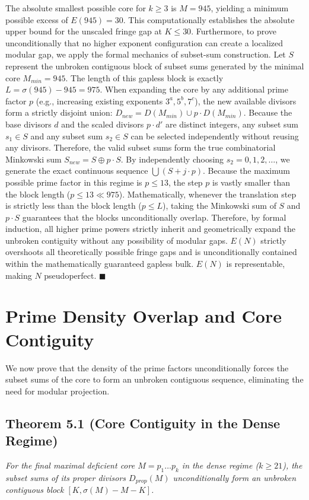\documentclass{erdos_paper}
\begin{document}
The absolute smallest possible core for $k \ge 3$ is $M=945$, yielding a minimum possible excess of $E(945) = 30$. This computationally establishes the absolute upper bound for the unscaled fringe gap at $K \le 30$. Furthermore, to prove unconditionally that no higher exponent configuration can create a localized modular gap, we apply the formal mechanics of subset-sum construction. Let $S$ represent the unbroken contiguous block of subset sums generated by the minimal core $M_{min} = 945$. The length of this gapless block is exactly $L = \sigma(945) - 945 = 975$. When expanding the core by any additional prime factor $p$ (e.g., increasing existing exponents $3^a, 5^b, 7^c$), the new available divisors form a strictly disjoint union: $D_{new} = D(M_{min}) \cup p \cdot D(M_{min})$. Because the base divisors $d$ and the scaled divisors $p \cdot d'$ are distinct integers, any subset sum $s_1 \in S$ and any subset sum $s_2 \in S$ can be selected independently without reusing any divisors. Therefore, the valid subset sums form the true combinatorial Minkowski sum $S_{new} = S \oplus p \cdot S$. By independently choosing $s_2 = 0, 1, 2, \dots$, we generate the exact continuous sequence $\bigcup (S + j \cdot p)$. Because the maximum possible prime factor in this regime is $p \le 13$, the step $p$ is vastly smaller than the block length ($p \le 13 \ll 975$). Mathematically, whenever the translation step is strictly less than the block length ($p \le L$), taking the Minkowski sum of $S$ and $p \cdot S$ guarantees that the blocks unconditionally overlap. Therefore, by formal induction, all higher prime powers strictly inherit and geometrically expand the unbroken contiguity without any possibility of modular gaps. $E(N)$ strictly overshoots all theoretically possible fringe gaps and is unconditionally contained within the mathematically guaranteed gapless bulk. $E(N)$ is representable, making $N$ pseudoperfect. $\blacksquare$

\section{Prime Density Overlap and Core Contiguity}

We now prove that the density of the prime factors unconditionally forces the subset sums of the core to form an unbroken contiguous sequence, eliminating the need for modular projection.

\subsection{Theorem 5.1 (Core Contiguity in the Dense Regime)}
\textit{For the final maximal deficient core $M = p_1 \dots p_k$ in the dense regime ($k \ge 21$), the subset sums of its proper divisors $D_{prop}(M)$ unconditionally form an unbroken contiguous block $[K, \sigma(M) - M - K]$.}
\end{document}
